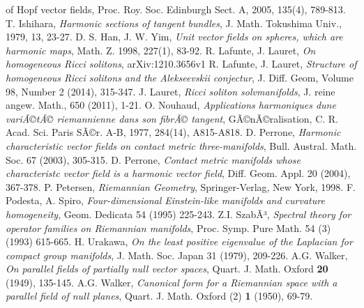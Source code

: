 \documentclass[11pt,oneside,leqno]{amsart}
\theoremstyle{plain}
\begin{document}
\begin{thebibliography}{99}
{of Hopf vector fields}, Proc. Roy. Soc. Edinburgh Sect. A, 2005, 135(4), 789-813.
 T. Ishihara, {\em Harmonic sections of tangent bundles}, J. Math. Tokushima Univ., 1979, 13, 23-27.
  D. S. Han,  J. W. Yim,  {\em Unit vector fields on spheres, which are harmonic maps}, Math. Z. 1998, 227(1), 83-92.
 R. Lafunte, J. Lauret,  {\em On homogeneous Ricci solitons}, arXiv:1210.3656v1
 R. Lafunte, J. Lauret,  {\em Structure of homogeneous Ricci solitons and the Alekseevskii conjectur}, J. Diff. Geom, Volume 98, Number 2 (2014), 315-347.
 J. Lauret,  {\em Ricci soliton solvmanifolds}, J. reine angew. Math., 650 (2011), 1-21.
 O. Nouhaud, {\em Applications harmoniques dune variÃ©tÃ© riemannienne dans son fibrÃ© tangent}, GÃ©nÃ©ralisation, C. R.
Acad. Sci. Paris SÃ©r. A-B, 1977, 284(14), A815-A818.
  D. Perrone, {\em Harmonic characteristic vector fields on contact metric three-manifolds}, Bull.
Austral. Math. Soc. 67 (2003), 305-315.
 D. Perrone, {\em Contact metric manifolds whose characteristc vector field is a harmonic vector
field}, Diff. Geom. Appl. 20 (2004), 367-378.
 P. Petersen,  {\em Riemannian Geometry}, Springer-Verlag, New York, 1998.
 F. Podesta, A. Spiro,  {\em Four-dimensional Einstein-like manifolds and curvature homogeneity}, Geom. Dedicata 54 (1995) 225-243.
 Z.I. SzabÃ³,  {\em Spectral theory for operator families on Riemannian manifolds}, Proc. Symp. Pure Math. 54 (3) (1993) 615-665.
 H. Urakawa,  {\em On the least positive eigenvalue of the Laplacian for compact group
manifolds}, J. Math. Soc. Japan 31 (1979), 209-226.
 A.G. Walker, {\em On parallel fields of partially null vector spaces}, Quart. J. Math.
 Oxford  \textbf{20} (1949), 135-145.
 A.G. Walker, {\em Canonical form for a Riemannian space with a parallel field of null planes}, Quart. J. Math. Oxford (2) \textbf{1} (1950), 69-79.
\end{thebibliography}
\end{document}
